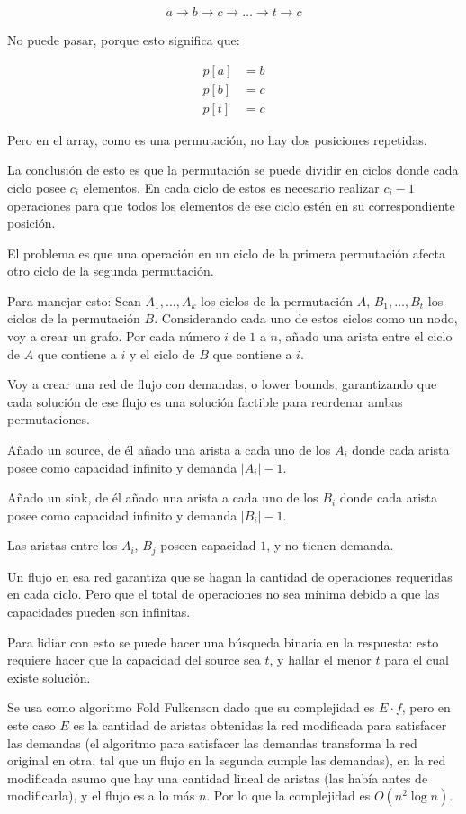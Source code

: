 \documentclass[14pt]{extarticle}
\begin{document}
\begin{align}
a \rightarrow b \rightarrow c \rightarrow \ldots \rightarrow t \rightarrow c
\end{align}

No puede pasar, porque esto significa que:

\begin{align}
p[a] &= b \\
p[b] &= c \\
p[t] &= c
\end{align}

Pero en el array, como es una permutación, no hay dos posiciones repetidas.

La conclusión de esto es que la permutación se puede dividir en ciclos donde cada ciclo posee $c_i$ elementos. En cada ciclo de estos es necesario realizar $c_i - 1$ operaciones para que todos los elementos de ese ciclo estén en su correspondiente posición.

El problema es que una operación en un ciclo de la primera permutación afecta otro ciclo de la segunda permutación.

Para manejar esto: Sean $A_1, \ldots, A_k$ los ciclos de la permutación $A$, $B_1, \ldots, B_t$ los ciclos de la permutación $B$. Considerando cada uno de estos ciclos como un nodo, voy a crear un grafo. Por cada número $i$ de $1$ a $n$, añado una arista entre el ciclo de $A$ que contiene a $i$ y el ciclo de $B$ que contiene a $i$.

Voy a crear una red de flujo con demandas, o lower bounds, garantizando que cada solución de ese flujo es una solución factible para reordenar ambas permutaciones.

Añado un source, de él añado una arista a cada uno de los $A_i$ donde cada arista posee como capacidad infinito y demanda $|A_i| - 1$.

Añado un sink, de él añado una arista a cada uno de los $B_i$ donde cada arista posee como capacidad infinito y demanda $|B_i| - 1$.

Las aristas entre los $A_i$, $B_j$ poseen capacidad $1$, y no tienen demanda.

Un flujo en esa red garantiza que se hagan la cantidad de operaciones requeridas en cada ciclo. Pero que el total de operaciones no sea mínima debido a que las capacidades pueden son infinitas.

Para lidiar con esto se puede hacer una búsqueda binaria en la respuesta: esto requiere hacer que la capacidad del source sea $t$, y hallar el menor $t$ para el cual existe solución.

Se usa como algoritmo Fold Fulkenson dado que su complejidad es $E \cdot f$, pero en este caso $E$ es la cantidad de aristas obtenidas la red modificada para satisfacer las demandas (el algoritmo para satisfacer las demandas transforma la red original en otra, tal que un flujo en la segunda cumple las demandas), en la red modificada asumo que hay una cantidad lineal de aristas (las había antes de modificarla), y el flujo es a lo más $n$. Por lo que la complejidad es $O(n^2 \log n)$.
\end{document}
